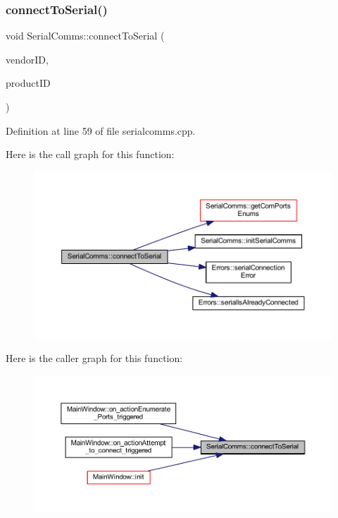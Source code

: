 \subsubsection{\texorpdfstring{connectToSerial()}{connectToSerial()}}
{\footnotesize\ttfamily void Serial\+Comms\+::connect\+To\+Serial (\begin{DoxyParamCaption}\item[{Q\+String}]{vendor\+ID,  }\item[{Q\+String}]{product\+ID }\end{DoxyParamCaption})}



Definition at line 59 of file serialcomms.\+cpp.

Here is the call graph for this function\+:
\nopagebreak
\begin{figure}[H]
\begin{center}
\leavevmode
\includegraphics[width=350pt]{class_serial_comms_a4488e53e2a6693ad72759eff9862ac37_cgraph}
\end{center}
\end{figure}
Here is the caller graph for this function\+:
\nopagebreak
\begin{figure}[H]
\begin{center}
\leavevmode
\includegraphics[width=350pt]{class_serial_comms_a4488e53e2a6693ad72759eff9862ac37_icgraph}
\end{center}
\end{figure}
\mbox{\label{class_serial_comms_a437fbaf140deae42fa64d914f8d13ec8}} 

